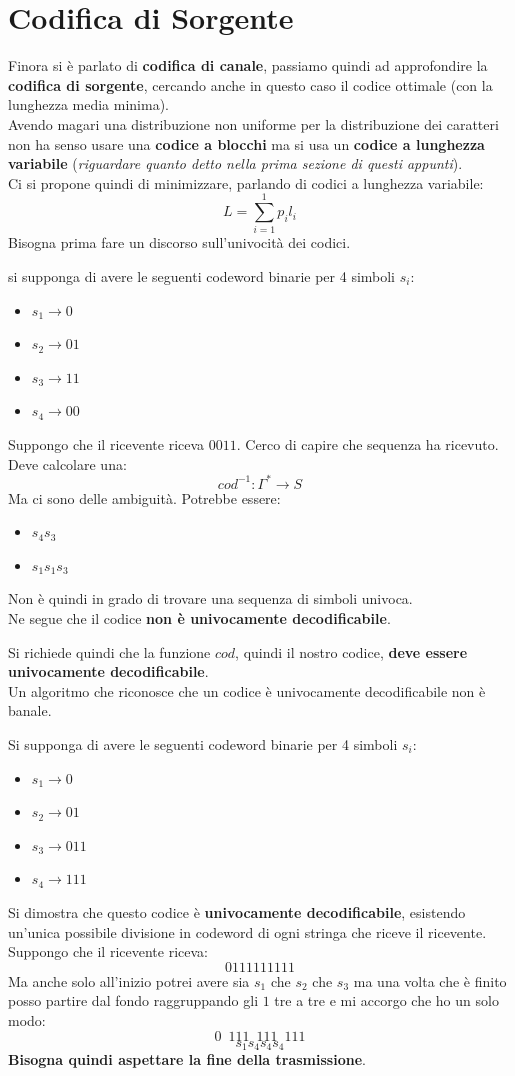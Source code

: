 \documentclass[a4paper,12pt, oneside]{book}
\begin{document}
\section{Codifica di Sorgente}
Finora si è parlato di \textbf{codifica di canale}, passiamo quindi ad
approfondire la \textbf{codifica di sorgente}, cercando anche in questo caso il
codice ottimale (con la lunghezza media minima).\\
Avendo magari una distribuzione non uniforme per la distribuzione dei caratteri
non ha senso usare una \textbf{codice a blocchi} ma si usa un 
\textbf{codice a lunghezza variabile} (\textit{riguardare quanto detto nella
  prima sezione di questi appunti}).\\
Ci si propone quindi di minimizzare, parlando di codici a lunghezza variabile:
\[L=\sum_{i=1}^1 p_il_i\]
Bisogna prima fare un discorso sull'univocità dei codici.
\begin{esempio}
  si supponga di avere le seguenti codeword binarie per 4 simboli $s_i$:
  \begin{itemize}
    \item $s_1\to 0$
    \item $s_2\to 01$
    \item $s_3\to 11$
    \item $s_4\to 00$
  \end{itemize}
  Suppongo che il ricevente riceva $0011$. Cerco di capire che sequenza ha
  ricevuto. Deve calcolare una:
  \[cod^{-1}:\Gamma^*\to S\]
  Ma ci sono delle ambiguità. Potrebbe essere:
  \begin{itemize}
    \item $s_4s_3$
    \item $s_1s_1s_3$
  \end{itemize}
  Non è quindi in grado di trovare una sequenza di simboli univoca.\\
  Ne segue che il codice \textbf{non è univocamente decodificabile}.
\end{esempio}
Si richiede quindi che la funzione $cod$, quindi il nostro codice, \textbf{deve
  essere univocamente decodificabile}. \\
Un algoritmo che riconosce che un codice è univocamente decodificabile non è
banale.
\begin{esempio}
  Si supponga di avere le seguenti codeword binarie per 4 simboli $s_i$:
  \begin{itemize}
    \item $s_1\to 0$
    \item $s_2\to 01$
    \item $s_3\to 011$
    \item $s_4\to 111$
  \end{itemize}
  Si dimostra che questo codice è \textbf{univocamente decodificabile},
  esistendo un'unica possibile divisione in codeword di ogni stringa che riceve
  il ricevente.\\
  Suppongo che il ricevente riceva:
  \[0111111111\]
  Ma anche solo all'inizio potrei avere sia $s_1$ che $s_2$ che $s_3$ ma una
  volta che è finito posso partire dal fondo raggruppando gli $1$ tre a tre e mi
  accorgo che ho un solo modo:
  \[0\,\,\,111\,\,\,111\,\,\,111\]
  \[s_1s_4s_4s_4\]
  \textbf{Bisogna quindi aspettare la fine della trasmissione}.
\end{esempio}
\end{document}
